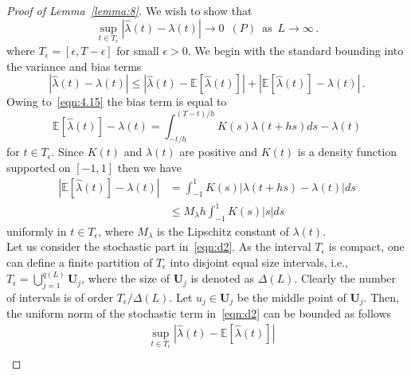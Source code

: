 \documentclass[lettersize,journal,onecolumn]{IEEEtran}
\theoremstyle{definition}
\newcommand{\E}[1]{\mathbb{E}\left[#1\right]}
\begin{document}
\begin{proof}[Proof of Lemma~\ref{lemma:8}]
	We wish to show that
	\begin{equation}
		\sup_{t\in T_{\epsilon}} \left|
		\widehat{\lambda}(t)-\lambda(t)
		\right| \to 0
		\enspace (P)
		\enspace \text{as}
		\enspace L \to \infty
		\label{eqn:d1}\,.
	\end{equation}
	where $T_{\epsilon}=[\epsilon,T-\epsilon]$ for small $\epsilon>0$. We begin with the 
	standard bounding into the variance and bias terms
	\begin{equation}
		\left|\widehat{\lambda}(t)-\lambda(t)\right| \leq
		\left|\widehat{\lambda}(t)-\E{\widehat{\lambda}(t)}\right| + 
		\left|\E{\widehat{\lambda}(t)}-\lambda(t)\right|
		\label{eqn:d2}\,.
	\end{equation}
	Owing to~\eqref{eqn:4.15} the bias term is equal to
	\begin{equation*}
		\E{\widehat{\lambda}(t)}-\lambda(t) = \int_{-t/h}^{(T-t)/h}
		K(s)\lambda\left(t+hs\right)ds-\lambda(t)
	\end{equation*}
	for $t\in T_{\epsilon}$. Since $K(t)$ and $\lambda(t)$ are positive and $K(t)$ is a 
	density function supported on $[-1,1]$ then we have
	\begin{equation*}
		\begin{split}
			\left|\E{\widehat{\lambda}(t)}-\lambda(t)\right| 
			& = \int_{-1}^{1} K(s)\left|\lambda\left(t+hs\right)-\lambda(t)\right|ds \\
			& \leq M_{\lambda}h \int_{-1}^{1} K(s)|s|ds
		\end{split}
	\end{equation*}
	uniformly in $t\in T_{\epsilon}$, where $M_{\lambda}$ is the Lipschitz
	constant of $\lambda(t)$.\\
	Let us consider the stochastic part in~\eqref{eqn:d2}. As the interval $T_{\epsilon}$ 
	is compact, one can define a finite partition of $T_{\epsilon}$ into disjoint 
	equal size intervals, i.e., \mbox{$
		T_{\epsilon} = \bigcup\limits_{j=1}^{q(L)} \mathbf{U}_{j}
		$}, where the size of $\mathbf{U}_{j}$ is denoted as $\Delta(L)$. Clearly the number 
	of intervals is of order \mbox{$T_{\epsilon}/\Delta(L)$}. Let 
	$u_{j}\in\mathbf{U}_{j}$ be the middle point of $\mathbf{U}_{j}$. Then, the uniform 
	norm of the stochastic term in~\eqref{eqn:d2} can be bounded as follows
	\begin{equation}
		\begin{split}
			& \sup_{t\in T_{\epsilon}}\left|
			\widehat{\lambda}(t)-\E{\widehat{\lambda}(t)}
			\right| \\

\end{split}
\end{equation}
\end{proof}
\end{document}
